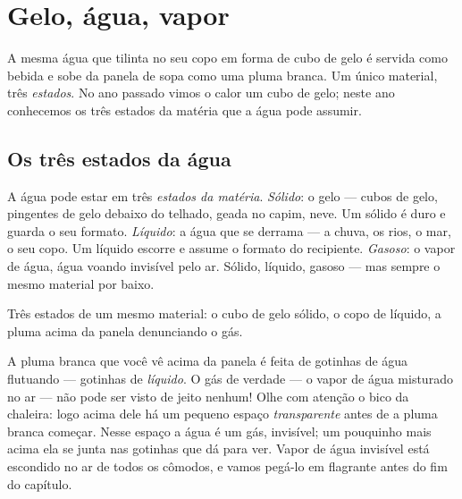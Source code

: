 \chapter{Gelo, água, vapor}\label{ch:g2:ice-water-steam}

A mesma água que tilinta no seu copo em forma de cubo de gelo é
servida como bebida e sobe da panela de sopa como uma pluma branca.
Um único material, três \emph{estados}. No ano passado vimos o calor
 um cubo de gelo; neste ano conhecemos os três estados da
matéria que a água pode assumir.

\section{Os três estados da água}

\begin{example}\label{ex:g2:ice-water-steam:where}
A água pode estar em três \emph{estados da matéria}.
\emph{Sólido}: o gelo --- cubos de gelo, pingentes de gelo debaixo do
telhado, geada no capim, neve. Um sólido é duro e guarda o seu
formato. \emph{Líquido}: a água que se derrama --- a chuva, os rios,
o mar, o seu copo. Um líquido escorre e assume o formato do
recipiente. \emph{Gasoso}: o vapor de água, água voando invisível
pelo ar. Sólido, líquido, gasoso --- mas sempre o mesmo material por
baixo.
\end{example}

\begin{omfigure}

{\small Três estados de um mesmo material: o cubo de gelo sólido, o
copo de líquido, a pluma acima da panela denunciando o gás.}
\end{omfigure}

\begin{remark}\label{rem:g2:ice-water-steam:invisible}
A pluma branca que você vê acima da panela é feita de gotinhas de
água flutuando --- gotinhas de \emph{líquido}. O gás de verdade --- o
vapor de água misturado no ar --- não pode ser visto de jeito nenhum!
Olhe com atenção o bico da chaleira: logo acima dele há um pequeno
espaço \emph{transparente} antes de a pluma branca começar. Nesse
espaço a água é um gás, invisível; um pouquinho mais acima ela se
junta nas gotinhas que dá para ver. Vapor de água invisível está
escondido no ar de todos os cômodos, e vamos pegá-lo em flagrante
antes do fim do capítulo.
\end{remark}

